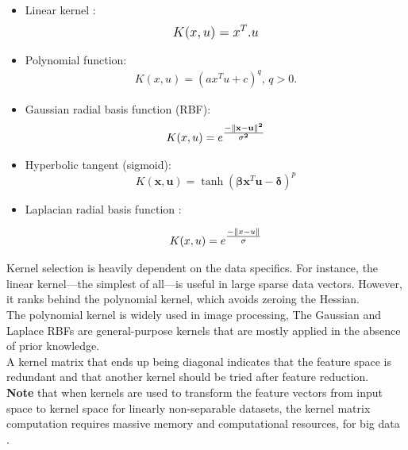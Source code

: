 \begin{itemize}

  \item  Linear kernel  : 
  \begin{align*}
  \mathlarger {K(x,u)=  x^{T}.u  }
   \end{align*}
  \item Polynomial function: 
  \begin{align*}
  K(x,u)=(ax^{T}u + c)^{q} ,\, q>0.
  \end{align*}
  \item Gaussian radial basis function (RBF): 
\begin{align*} 
 K(x,u) = e^{\mathlarger{\frac{\mathbf{-\| x -  u\|^2}}{\mathbf{\sigma^2} } }}
\end{align*}
   
  \item  Hyperbolic tangent (sigmoid):
    \begin{equation}
      K(\mathbf x, \mathbf u) = \tanh(\mathbf {\beta} \mathbf x^{T} \mathbf u - \mathbf{\delta})^p
    \end{equation}
    
    \item Laplacian radial basis function : 
    
    \begin{align*} 
      K(x,u) = e^{\mathlarger{\frac{-\| x -  u\|}{\sigma} } }
     \end{align*}
    
\end{itemize}

Kernel selection is heavily dependent on the data specifics. For instance, the linear kernel—the simplest
of all—is useful in large sparse data vectors. However, it ranks behind the polynomial kernel, which avoids
zeroing the Hessian. \\The polynomial kernel is widely used in image processing, The Gaussian and Laplace RBFs are general-purpose kernels
that are mostly applied in the absence of prior knowledge. \\A kernel matrix that ends up being diagonal indicates that the feature space is redundant and that another kernel should be tried after feature reduction.\\

\textbf{
Note} that when kernels are used to transform the feature vectors from input space to kernel space for linearly non-separable datasets, the kernel matrix computation requires massive memory and computational
resources, for big data . 



